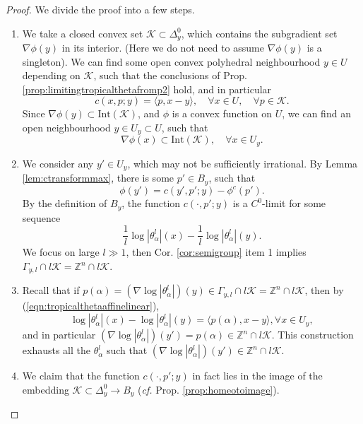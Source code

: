 \documentclass[a4paper]{article}
\theoremstyle{definition}
\newcommand{\cf}{\emph{cf.} }
\newcommand{\Z}{\mathbb{Z}}
\begin{document}
	
	\begin{proof}
		We divide the proof into a few steps.
		
	\begin{enumerate}
		\item  We take a closed convex set $\mathcal{K}\subset \Delta_y^0$, which contains the subgradient set $\nabla \phi(y)$ in its interior. (Here we do not need to assume $\nabla \phi(y)$ is a singleton). We can find some open convex polyhedral neighbourhood $y\in U$ depending on $\mathcal{K}$, such that the conclusions of Prop. \ref{prop:limitingtropicalthetafromp2} hold, and in particular
		\[
		c(x,p;y)= \langle p, x-y\rangle,\quad \forall x\in U, \quad \forall p\in \mathcal{K}.
		\]
		Since $\nabla \phi(y)\subset \text{Int}(\mathcal{K})$, and $\phi$ is a convex function on $U$, we can find an open neighbourhood $y\in U_y\subset U$, such that 
		\[
		\nabla \phi(x)\subset \text{Int}(\mathcal{K}),\quad \forall x\in U_y.
		\]
		
		
		\item We consider any $y'\in U_y$, which may not be sufficiently irrational. By Lemma \ref{lem:ctransformmax}, there is some $p'\in B_y$, such that 
		\[
		\phi(y')= c(y',p';y) - \phi^c(p').
		\]
	By the definition of $B_y$, the function $c(\cdot, p'; y)$ is a $C^0$-limit for some sequence
		\[
		   \frac{1}{l}  \log |\theta_\alpha^l | (x)-   \frac{1}{l}  \log |\theta_\alpha^l | (y).
		\]
		We focus on  large $l\gg 1$, then Cor. \ref{cor:semigroup} item 1 implies $\Gamma_{y,l}\cap l\mathcal{K}= \Z^n \cap  l\mathcal{K}$. 
		
		
		
	\item 
			Recall that if $p(\alpha)= (\nabla \log |\theta_\alpha^l|)(y)\in \Gamma_{y,l}\cap l \mathcal{K}=   \Z^n \cap  l\mathcal{K}  $, then by (\ref{eqn:tropicalthetaaffinelinear}),
		\[
		\log |\theta_\alpha^l |(x)- \log |\theta_\alpha^l | (y) = \langle p(\alpha), x-y\rangle, \forall x\in U_y,
		\]
		and in particular $(\nabla 	\log |\theta_\alpha^l | )(y')= p(\alpha) \in \Z^n \cap l \mathcal{K}$.
		This construction exhausts all the $\theta_\alpha^l$ such that 
		$(\nabla 	\log |\theta_\alpha^l | )(y')\in \Z^n \cap l \mathcal{K}$.
		
		
\item 
		
		
			We claim that the function $c(\cdot, p'; y)$ in fact lies in the image of the embedding $\mathcal{K} \subset \Delta_y^0 \to B_y$ (\cf Prop. \ref{prop:homeotoimage}). 
		

\end{enumerate}
\end{proof}
\end{document}
